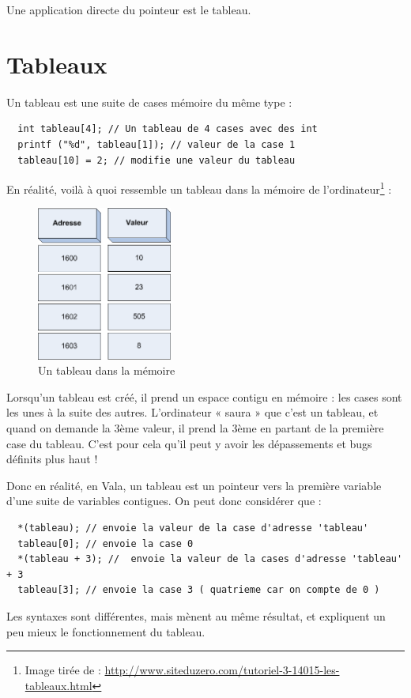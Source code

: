 Une application directe du pointeur est le tableau.

\section{Tableaux}
\label{DefTableaux}
Un tableau est une suite de cases mémoire du même type : 
\begin{lstlisting}
  int tableau[4]; // Un tableau de 4 cases avec des int
  printf ("%d", tableau[1]); // valeur de la case 1
  tableau[10] = 2; // modifie une valeur du tableau
\end{lstlisting}

En réalité, voilà à quoi ressemble un tableau dans la mémoire de l'ordinateur\footnote{Image tirée de : \url{http://www.siteduzero.com/tutoriel-3-14015-les-tableaux.html}} : 
\begin{figure}[H]
	\begin{center}
	  \includegraphics[width=12em]{Annexes/Images/tableau.png}
	\end{center}
	\caption{Un tableau dans la mémoire}
\end{figure}

Lorsqu'un tableau est créé, il prend un espace contigu en mémoire : les cases sont les unes à la suite des autres. L'ordinateur « saura » que c'est un tableau, et quand on demande la 3ème valeur, il prend la 3ème en partant de la première case du tableau. C'est pour cela qu'il peut y avoir les dépassements et bugs définits plus haut !

Donc en réalité, en Vala, un tableau est un pointeur vers la première variable d'une suite de variables contigues. On peut donc considérer que : 
\begin{lstlisting}
  *(tableau); // envoie la valeur de la case d'adresse 'tableau'
  tableau[0]; // envoie la case 0
  *(tableau + 3); //  envoie la valeur de la cases d'adresse 'tableau' + 3
  tableau[3]; // envoie la case 3 ( quatrieme car on compte de 0 )
\end{lstlisting}
Les syntaxes sont différentes, mais mènent au même résultat, et expliquent un peu mieux le fonctionnement du tableau.

